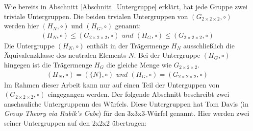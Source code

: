 \documentclass[12pt,a4paper, usenames, dvipsnames]{article}
\theoremstyle{mystyle}
\theoremstyle{definition}
\newcommand{\Gtwo}{\ensuremath{G_{2\times 2\times 2}}}
\begin{document}
Wie bereits in Abschnitt \ref{Abschnitt_Untergruppe} erklärt, hat jede Gruppe zwei triviale Untergruppen. Die beiden trvialen Untergruppen von $(\Gtwo, \circ)$ werden hier $(H_N, \circ)$ und $(H_G, \circ)$ genannt: 
\begin{align*}
(H_N, \circ) \leqslant (\Gtwo, \circ)\textit{ und }(H_G, \circ) \leqslant (\Gtwo, \circ)
\end{align*} 
Die Untergruppe $(H_N, \circ)$ enthält in der Trägermenge $H_N$ ausschließlich die Äquivalenzklasse des neutralen Elements $N$. Bei der Untergruppe $(H_G, \circ)$ hingegen ist die Trägermenge $H_G$ die gleiche Menge wie $\Gtwo$. 
\begin{align*}
(H_N, \circ) = (\{N\}, \circ)\textit{ und }  (H_G, \circ) = (\Gtwo, \circ)
\end{align*}
Im Rahmen dieser Arbeit kann nur auf einen Teil der Unterguppen von $(\Gtwo, \circ)$ eingegangen werden. 
Der folgende Abschnitt beschreibt zwei anschauliche Untergruppenn des Würfels. Diese Untergruppen hat Tom Davis (in  \textit{Group Theory via Rubik's Cube}) \cite{TD} für den 3x3x3-Würfel genannt. Hier werden zwei seiner Untergruppen auf den 2x2x2 übertragen: 
\end{document}
